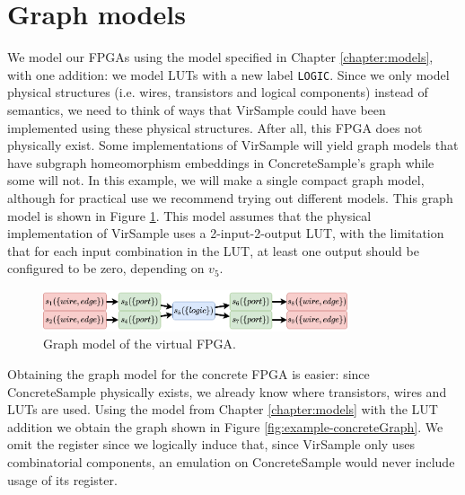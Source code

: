 \section{Graph models}
\label{sec:example-graphmodels}
We model our FPGAs using the model specified in Chapter \ref{chapter:models}, with one addition: we model LUTs with a new label \texttt{LOGIC}. Since we only model physical structures (i.e. wires, transistors and logical components) instead of semantics, we need to think of ways that VirSample could have been implemented using these physical structures. After all, this FPGA does not physically exist. Some implementations of VirSample will yield graph models that have subgraph homeomorphism embeddings in ConcreteSample's graph while some will not. In this example, we will make a single compact graph model, although for practical use we recommend trying out different models. This graph model is shown in Figure \ref{fig:example-virtualGraph}. This model assumes that the physical implementation of VirSample uses a 2-input-2-output LUT, with the limitation that for each input combination in the LUT, at least one output should be configured to be zero, depending on $v_5$.

\begin{figure}[t]
\centering
\includegraphics[width=0.8\textwidth]{images/endToEnd/virtualFPGAGraph.png}
\caption{Graph model of the virtual FPGA.}
\label{fig:example-virtualGraph}
\end{figure}

Obtaining the graph model for the concrete FPGA is easier: since ConcreteSample physically exists, we already know where transistors, wires and LUTs are used. Using the model from Chapter \ref{chapter:models} with the LUT addition we obtain the graph shown in Figure \ref{fig:example-concreteGraph}. We omit the register since we logically induce that, since VirSample only uses combinatorial components, an emulation on ConcreteSample would never include usage of its register.

